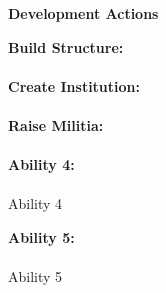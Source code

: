 \documentclass[12pt]{extarticle}
\begin{document}
    \newpage
    \begin{center}\huge \textbf{Development Actions} \end{center}
    \large \textbf{Build Structure:}
    \small\paragraph{}\par
    \bigskip
    \noindent\large \textbf{Create Institution:}
    \small\paragraph{}\par
    \bigskip
    \noindent\large \textbf{Raise Militia:}
    \small\paragraph{}\par
    \bigskip
    \noindent\large \textbf{Ability 4:}
    \small\paragraph{}Ability 4\par
    \bigskip
    \noindent\large \textbf{Ability 5:}
    \small\paragraph{}Ability 5\par
    \bigskip
\end{document}
